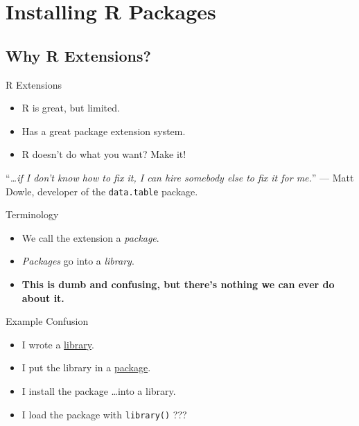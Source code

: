\section{Installing R Packages}
\makesubcontentsslides


\subsection{Why R Extensions?}
\makesubcontentsslidessec

\begin{frame}
  \begin{block}{R Extensions}
    \begin{itemize}
      \item R is great, but limited.
      \item Has a great package extension system.
      \item R doesn't do what you want?  Make it!
    \end{itemize}
    \vspace{.4cm}\pause
    ``\textit{\dots if I don’t know how to fix it, I can hire somebody else to 
fix it for me.}'' --- Matt Dowle, developer of the \texttt{data.table} 
package.
  \end{block}
\end{frame}


\begin{frame}
  \begin{block}{Terminology}\pause
    \begin{itemize}
      \item We call the extension a \textit{package}.\pause
      \item \textit{Packages} go into a \textit{library}.\pause
      \item \textbf{This is dumb and confusing, but there's nothing we can 
ever do about it.}
    \end{itemize}
  \end{block}
\end{frame}


\begin{frame}
  \begin{block}{Example Confusion}\pause
    \begin{itemize}
      \item I wrote a 
\href{https://github.com/wrathematics/memuse/tree/master/src/meminfo}%
{library}.\pause
      \item I put the library in a 
\href{https://github.com/wrathematics/memuse}{package}.\pause
      \item I install the package \dots into a library.\pause
      \item I load the package with \texttt{library()} ???
    \end{itemize}
  \end{block}
\end{frame}



